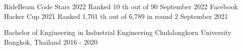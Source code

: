 \documentclass[]{awesome-cv}
\begin{document}
\begin{cvhonors}
	\cvhonor
	{RideBeam Code Stars 2022}
	{Ranked 10 th out of 90}
	{September 2022}
	\cvhonor
	{Facebook Hacker Cup 2021}
	{Ranked 1,701 th out of 6,789 in round 2}
	{September 2021}
\end{cvhonors}

\begin{cventries}
	\cventry
	{Bachelor of Engineering in Industrial Engineering}
	{Chulalongkorn University}
	{Bangkok, Thailand}
	{2016 - 2020}
	{}
\end{cventries}

\let\clearpage\relax
\end{document}
